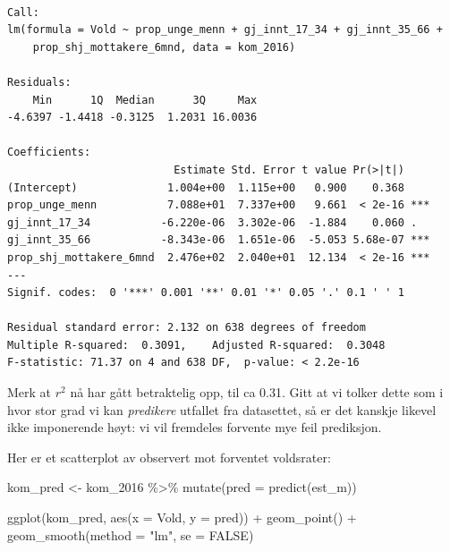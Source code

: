 \documentclass[
  letterpaper,
  DIV=11,
  numbers=noendperiod]{scrreprt}
\newenvironment{Shaded}{\begin{snugshade}}{\end{snugshade}}
\newcommand{\AttributeTok}[1]{\textcolor[rgb]{0.40,0.45,0.13}{#1}}
\newcommand{\ConstantTok}[1]{\textcolor[rgb]{0.56,0.35,0.01}{#1}}
\newcommand{\FunctionTok}[1]{\textcolor[rgb]{0.28,0.35,0.67}{#1}}
\newcommand{\NormalTok}[1]{\textcolor[rgb]{0.00,0.23,0.31}{#1}}
\newcommand{\OtherTok}[1]{\textcolor[rgb]{0.00,0.23,0.31}{#1}}
\newcommand{\SpecialCharTok}[1]{\textcolor[rgb]{0.37,0.37,0.37}{#1}}
\newcommand{\StringTok}[1]{\textcolor[rgb]{0.13,0.47,0.30}{#1}}
\theoremstyle{definition}
\theoremstyle{remark}
\begin{document}
\begin{verbatim}

Call:
lm(formula = Vold ~ prop_unge_menn + gj_innt_17_34 + gj_innt_35_66 + 
    prop_shj_mottakere_6mnd, data = kom_2016)

Residuals:
    Min      1Q  Median      3Q     Max 
-4.6397 -1.4418 -0.3125  1.2031 16.0036 

Coefficients:
                          Estimate Std. Error t value Pr(>|t|)    
(Intercept)              1.004e+00  1.115e+00   0.900    0.368    
prop_unge_menn           7.088e+01  7.337e+00   9.661  < 2e-16 ***
gj_innt_17_34           -6.220e-06  3.302e-06  -1.884    0.060 .  
gj_innt_35_66           -8.343e-06  1.651e-06  -5.053 5.68e-07 ***
prop_shj_mottakere_6mnd  2.476e+02  2.040e+01  12.134  < 2e-16 ***
---
Signif. codes:  0 '***' 0.001 '**' 0.01 '*' 0.05 '.' 0.1 ' ' 1

Residual standard error: 2.132 on 638 degrees of freedom
Multiple R-squared:  0.3091,    Adjusted R-squared:  0.3048 
F-statistic: 71.37 on 4 and 638 DF,  p-value: < 2.2e-16
\end{verbatim}

Merk at \(r^2\) nå har gått betraktelig opp, til ca 0.31. Gitt at vi
tolker dette som i hvor stor grad vi kan \emph{predikere} utfallet fra
datasettet, så er det kanskje likevel ikke imponerende høyt: vi vil
fremdeles forvente mye feil prediksjon.

Her er et scatterplot av observert mot forventet voldsrater:

\begin{Shaded}
\begin{Highlighting}[]
\NormalTok{kom\_pred }\OtherTok{\textless{}{-}}\NormalTok{ kom\_2016 }\SpecialCharTok{\%\textgreater{}\%} 
  \FunctionTok{mutate}\NormalTok{(}\AttributeTok{pred =} \FunctionTok{predict}\NormalTok{(est\_m))}

\FunctionTok{ggplot}\NormalTok{(kom\_pred, }\FunctionTok{aes}\NormalTok{(}\AttributeTok{x =}\NormalTok{ Vold, }\AttributeTok{y =}\NormalTok{ pred)) }\SpecialCharTok{+}
  \FunctionTok{geom\_point}\NormalTok{() }\SpecialCharTok{+}
  \FunctionTok{geom\_smooth}\NormalTok{(}\AttributeTok{method =} \StringTok{"lm"}\NormalTok{, }\AttributeTok{se =} \ConstantTok{FALSE}\NormalTok{)}
\end{Highlighting}
\end{Shaded}
\end{document}
